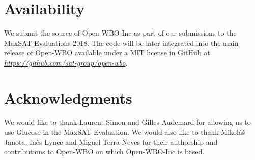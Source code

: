 \documentclass[conference]{IEEEtran}
\newcommand{\toolname}{\textsf{Open-WBO-Inc}\xspace}
\begin{document}
\section{Availability}

We submit the source of \toolname as part of our submissions to the MaxSAT Evaluations 2018. The code will be later integrated into the main release of \textsf{Open-WBO} available under a MIT license in GitHub at \emph{\url{https://github.com/sat-group/open-wbo}}.

\section*{Acknowledgments}

We would like to thank Laurent Simon and Gilles Audemard for
allowing us to use Glucose in the MaxSAT Evaluation. We
would also like to thank Mikol{\'a}{\v{s}} Janota,  In\^es Lynce and Miguel
Terra-Neves for their authorship and contributions to
\textsf{Open-WBO} on which \toolname is based.

\balance




\end{document}

